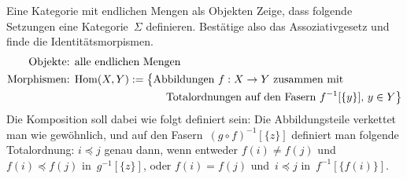 \documentclass{uebblatt}
\begin{document}
\begin{aufgabe}{Eine Kategorie mit endlichen Mengen als Objekten}
Zeige, dass folgende Setzungen eine Kategorie~$\Sigma$ definieren. Bestätige
also das Assoziativgesetz und finde die Identitätsmorpismen.
\begin{align*}
  \text{Objekte: } & \text{alle endlichen Mengen} \\
  \text{Morphismen: } &
    \mathrm{Hom}(X,Y) := \bigl\{
      \text{Abbildungen~$f : X \to Y$ zusammen mit} \\
    & \qquad\qquad\qquad\qquad \text{
      Totalordnungen auf den Fasern~$f^{-1}[\{y\}]$, $y \in Y$} \bigr\}
\end{align*}
Die Komposition soll dabei wie folgt definiert sein: Die Abbildungsteile
verkettet man wie gewöhnlich, und auf den Fasern~$(g \circ f)^{-1}[\{z\}]$
definiert man folgende Totalordnung: $i \preceq j$ genau dann, wenn entweder
$f(i) \neq f(j)$ und~$f(i) \preceq f(j)$ in~$g^{-1}[\{z\}]$, oder $f(i) =
f(j)$ und~$i \preceq j$ in~$f^{-1}[\{f(i)\}]$.
\end{aufgabe}
\end{document}
